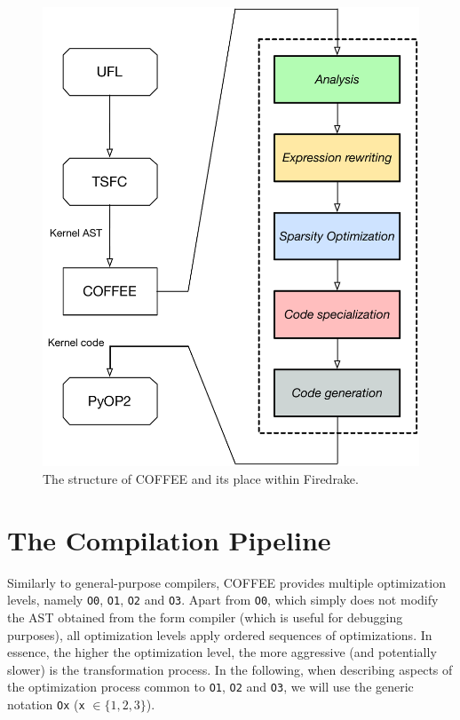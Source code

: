 \begin{figure}
\centering
\includegraphics[scale=0.50]{coffee/pictures/coffee-pipeline.pdf}
\caption{The structure of COFFEE and its place within Firedrake.}
\label{fig:coffee-pipeline}
\end{figure}

\section{The Compilation Pipeline}
\label{sec:coffee:pipeline}
Similarly to general-purpose compilers, COFFEE provides multiple optimization levels, namely \texttt{O0}, \texttt{O1}, \texttt{O2} and \texttt{O3}. Apart from \texttt{O0}, which simply does not modify the AST obtained from the form compiler (which is useful for debugging purposes), all optimization levels apply ordered sequences of optimizations. In essence, the higher the optimization level, the more aggressive (and potentially slower) is the transformation process. In the following, when describing aspects of the optimization process common to \texttt{O1}, \texttt{O2} and \texttt{O3}, we will use the generic notation \texttt{Ox} (\texttt{x} $\in \lbrace 1, 2, 3\rbrace$).

